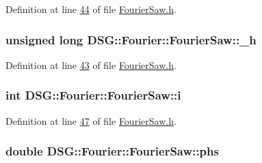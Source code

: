 Definition at line \hyperlink{_fourier_saw_8h_source_l00044}{44} of file \hyperlink{_fourier_saw_8h_source}{Fourier\+Saw.\+h}.

\hypertarget{class_d_s_g_1_1_fourier_1_1_fourier_saw_a78d30240b7eb99fcb249b5aafe3d55b2}{
\subsubsection[{\+\_\+h}]{\setlength{\rightskip}{0pt plus 5cm}unsigned long D\+S\+G\+::\+Fourier\+::\+Fourier\+Saw\+::\+\_\+h\hspace{0.3cm}{\ttfamily [protected]}}}\label{class_d_s_g_1_1_fourier_1_1_fourier_saw_a78d30240b7eb99fcb249b5aafe3d55b2}


Definition at line \hyperlink{_fourier_saw_8h_source_l00043}{43} of file \hyperlink{_fourier_saw_8h_source}{Fourier\+Saw.\+h}.

\hypertarget{class_d_s_g_1_1_fourier_1_1_fourier_saw_a261b19d0082558b6e1bb128d267c400d}{
\subsubsection[{i}]{\setlength{\rightskip}{0pt plus 5cm}int D\+S\+G\+::\+Fourier\+::\+Fourier\+Saw\+::i\hspace{0.3cm}{\ttfamily [protected]}}}\label{class_d_s_g_1_1_fourier_1_1_fourier_saw_a261b19d0082558b6e1bb128d267c400d}


Definition at line \hyperlink{_fourier_saw_8h_source_l00047}{47} of file \hyperlink{_fourier_saw_8h_source}{Fourier\+Saw.\+h}.

\hypertarget{class_d_s_g_1_1_fourier_1_1_fourier_saw_a5df3e5b00224924e106ffdc1d0b6a3cc}{
\subsubsection[{phs}]{\setlength{\rightskip}{0pt plus 5cm}double D\+S\+G\+::\+Fourier\+::\+Fourier\+Saw\+::phs\hspace{0.3cm}{\ttfamily [protected]}}}\label{class_d_s_g_1_1_fourier_1_1_fourier_saw_a5df3e5b00224924e106ffdc1d0b6a3cc}


